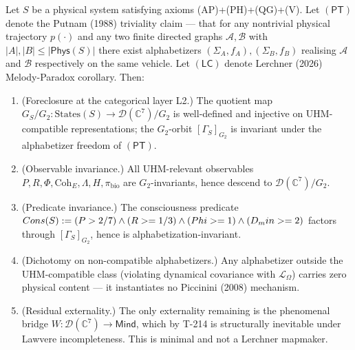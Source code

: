 \begin{theorembox}
\label{thm:t-223}
Let $S$ be a physical system satisfying axioms (AP)+(PH)+(QG)+(V).
Let $(\mathsf{PT})$ denote the Putnam (1988) triviality claim —
that for any nontrivial physical trajectory $p(\cdot)$ and any
two finite directed graphs $\mathcal A, \mathcal B$ with
$|A|,|B| \leq |\mathsf{Phys}(S)|$ there exist alphabetizers
$(\Sigma_A, f_A), (\Sigma_B, f_B)$ realising $\mathcal A$ and
$\mathcal B$ respectively on the same vehicle. Let $(\mathsf{LC})$
denote Lerchner (2026) Melody-Paradox corollary. Then:
\begin{enumerate}[leftmargin=2em,nosep]
  \item[(a)] (Foreclosure at the categorical layer L2.) The
        quotient map $G_S/G_2: \mathrm{States}(S) \to
        \mathcal D(\mathbb C^7)/G_2$ is well-defined and injective
        on UHM-compatible representations; the $G_2$-orbit
        $[\Gamma_S]_{G_2}$ is invariant under the alphabetizer
        freedom of $(\mathsf{PT})$.
  \item[(b)] (Observable invariance.) All UHM-relevant observables
        $P, R, \Phi, \mathrm{Coh}_E, \Lambda, H, \pi_{\mathrm{bio}}$
        are $G_2$-invariants, hence descend to
        $\mathcal D(\mathbb C^7)/G_2$.
  \item[(c)] (Predicate invariance.) The consciousness predicate
        $Cons(S) := (P > 2/7) \wedge (R >= 1/3) \wedge
        (Phi >= 1) \wedge (D_min >= 2)$ factors through
        $[\Gamma_S]_{G_2}$, hence is alphabetization-invariant.
  \item[(d)] (Dichotomy on non-compatible alphabetizers.) Any
        alphabetizer outside the UHM-compatible class (violating
        dynamical covariance with $\mathcal L_\Omega$) carries zero
        physical content --- it instantiates no Piccinini (2008)
        mechanism.
  \item[(e)] (Residual externality.) The only externality remaining
        is the phenomenal bridge $W: \mathcal D(\mathbb C^7) \to
        \mathsf{Mind}$, which by T-214  is structurally
        inevitable under Lawvere incompleteness. This is minimal
        and not a Lerchner mapmaker.
\end{enumerate}
\end{theorembox}

